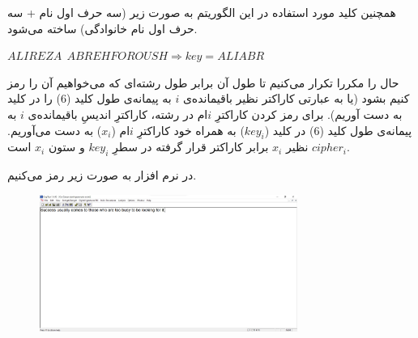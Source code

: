 \documentclass{article}
\begin{document}
همچنین کلید مورد استفاده در این الگوریتم به صورت زیر (سه حرف اول نام + سه حرف اول نام خانوادگی) ساخته می‌شود.
\begin{latin}
$
ALIREZA\:\:ABREHFOROUSH \Rightarrow key = ALIABR
$
\end{latin}
حال  را مکررا تکرار می‌کنیم تا طول آن برابر طول رشته‌ای که می‌خواهیم آن را رمز کنیم بشود (یا به عبارتی کاراکتر نظیر باقیمانده‌ی $i$ به پیمانه‌ی طول کلید (6) را در کلید به دست آوریم). برای رمز کردن کاراکترِ $i$ام در رشته، کاراکترِ اندیسِ باقیمانده‌ی $i$ به پیمانه‌ی طول کلید (6) در کلید ($key_i$) به همراه خود کاراکترِ $i$ام ($x_i$) به دست می‌آوریم. $cipher_i$ نظیر $x_i$ برابر کاراکتر قرار گرفته در سطرِ $key_i$ و ستون $x_i$ است.
\begin{latin}
\begin{table}[H]
\centering
{}
\end{table}
\end{latin}
در نرم افزار  به صورت زیر رمز می‌کنیم.
\begin{figure}[H]
    \centering
    \includegraphics[width=0.75\textwidth]{figures/3aa.jpg}
    \caption
	{}
    \label{fig:fig1}
\end{figure}
\end{document}
